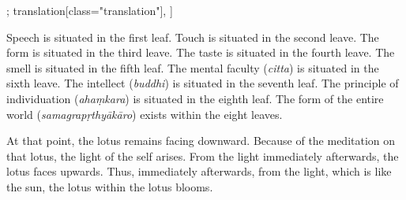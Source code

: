 \begin{alignment}[
  texts=edition[class="edition"];
  translation[class="translation"],
  ]
\begin{translation}
\begin{tlate}[p47_01]
Speech is situated in the first leaf. Touch is situated in the second leave. The form is situated in the third leave. The taste is situated in the fourth leave. The smell is situated in the fifth leaf. The mental faculty (\textit{citta}) is situated in the sixth leave. The intellect (\textit{buddhi}) is situated in the seventh leaf. The principle of individuation (\textit{ahaṃkara}) is situated in the eighth leaf. The form of the entire world (\textit{samagrapṛthyākāro}) exists within the eight leaves.

At that point, the lotus remains facing downward. Because of the meditation on that lotus, the light of the self arises. From the light immediately afterwards, the lotus faces upwards. Thus, immediately afterwards, from the light, which is like the sun, the lotus within the lotus blooms.
\flushpage
    \end{tlate}
  \end{translation}
\end{alignment}
\pagebreak %
